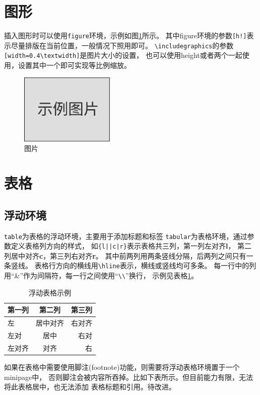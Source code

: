 \section{图形}
\label{sec-figure}
插入图形时可以使用\texttt{figure}环境，示例如图\ref{fig-sample}所示。
其中figure环境的参数\verb|[h!]|表示尽量排版在当前位置，一般情况下照用即可。
\verb|\includegraphics|的参数\verb|[width=0.4\textwidth]|是图片大小的设置，
也可以使用height或者两个一起使用，设置其中一个即可实现等比例缩放。
\begin{figure}[h!]
    \centering
    \includegraphics[width=0.4\textwidth]{figure/image.pdf}
    \caption{图片}
    \label{fig-sample}
\end{figure}

\section{表格}
\label{sec-table}

\subsection{浮动环境}
\label{subsec-table-float}
\texttt{table}为表格的浮动环境，主要用于添加标题和标签
\texttt{tabular}为表格环境，通过参数定义表格列方向的样式，
如\verb+{l||c|r}+表示表格共三列，第一列左对齐{\bf l}，
第二列居中对齐{\bf c}，第三列右对齐{\bf r}。
其中前两列用两条竖线分隔，后两列之间只有一条竖线。
表格行方向的横线用\verb|\hline|表示，横线或竖线均可多条。
每一行中的列用“\&”作为间隔符，每一行之间使用“\verb|\\|”换行，
示例见表格\ref{tab-sample}。
\begin{table}
    \centering
    \caption{浮动表格示例}
    \label{tab-sample}
    \begin{tabular}{l||c|r}
        \hline
        第一列 & 第二列   & 第三列 \\ \hline \hline
        左     & 居中对齐 & 右对齐 \\ \hline
        左对   & 居中     & 右对   \\ \hline
        左对齐 & 对齐     & 右     \\ \hline
    \end{tabular}
\end{table}
如果在表格中需要使用脚注(footnote)功能，则需要将浮动表格环境置于一个minipage中，
否则脚注会被内容所吞掉。比如下表所示。但目前能力有限，无法将此表格居中，也无法添加
表格标题和引用。待改进。


